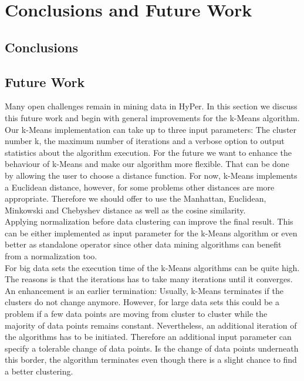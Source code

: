 \chapter{Conclusions and Future Work}\label{chapter:conclusion}


\section{Conclusions}

\section{Future Work}

Many open challenges remain in mining data in HyPer. In this section we discuss this future work and begin with general improvements for the k-Means algorithm.
\\
Our k-Means implementation can take up to three input parameters: The cluster number k, the maximum number of iterations and a verbose option to output statistics about the algorithm execution. For the future we want to enhance the behaviour of k-Means and make our algorithm more flexible. That can be done by allowing the user to choose a distance function. For now, k-Means implements a Euclidean distance, however, for some problems other distances are more appropriate. Therefore we should offer to use the Manhattan, Euclidean, Minkowski and Chebyshev distance as well as the cosine similarity.
\\
Applying normalization before data clustering can improve the final result. This can be either implemented as input parameter for the k-Means algorithm or even better as standalone operator since other data mining algorithms can benefit from a normalization too.
\\
For big data sets the execution time of the k-Means algorithms can be quite high. The reasons is that the iterations has to take many iterations until it converges. An enhancement is an earlier termination: Usually, k-Means terminates if the clusters do not change anymore. However, for large data sets this could be a problem if a few data points are moving from cluster to cluster while the majority of data points remains constant. Nevertheless, an additional iteration of the algorithms has to be initiated. Therefore an additional input parameter can specify a tolerable change of data points. Is the change of data points underneath this border, the algorithm terminates even though there is a slight chance to find a better clustering.
